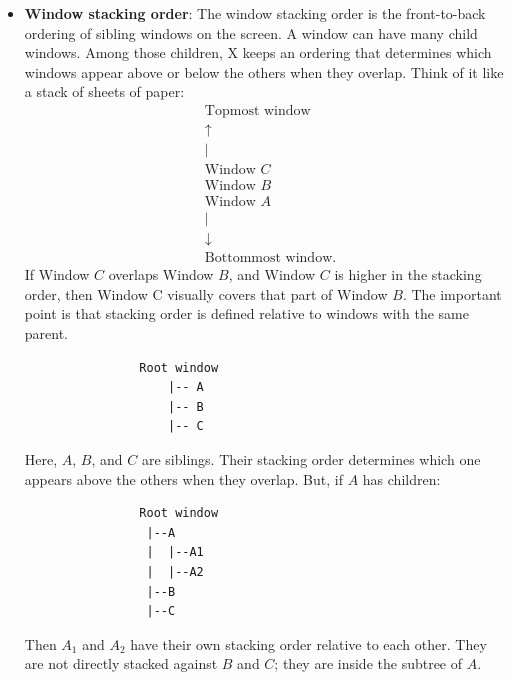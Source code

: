 \documentclass{report}
\begin{document}
\begin{itemize}
            \bigbreak \noindent 
            \textbf{XDestroySubwindows} can generate a \textbf{BadWindow} error.
        \item \textbf{Window stacking order}: The window stacking order is the front-to-back ordering of sibling windows on the screen.
            \bigbreak \noindent 
            A window can have many child windows. Among those children, X keeps an ordering that determines which windows appear above or below the others when they overlap.
            \bigbreak \noindent 
            Think of it like a stack of sheets of paper:
            \begin{align*}
                &\text{Topmost window} \\
                &\uparrow \\
                &\mid \\
                &\text{Window $C$} \\
                &\text{Window $B$} \\
                &\text{Window $A$} \\
                &\mid \\
                &\downarrow \\
                &\text{Bottommost window}
            .\end{align*}
            If Window $C$ overlaps Window $B$, and Window $C$ is higher in the stacking order, then Window C visually covers that part of Window $B$.
            \bigbreak \noindent 
            The important point is that stacking order is defined relative to windows with the same parent.
            \bigbreak \noindent 
            \begin{verbatim}
                Root window
                    |-- A
                    |-- B
                    |-- C
            \end{verbatim}
            \bigbreak \noindent 
            Here, $A$, $B$, and $C$ are siblings. Their stacking order determines which one appears above the others when they overlap.
            \bigbreak \noindent 
            But, if $A$ has children:
            \begin{verbatim}
                Root window
                 |--A
                 |  |--A1
                 |  |--A2
                 |--B
                 |--C
            \end{verbatim}
            \bigbreak \noindent 
            Then $A_{1}$ and $A_{2}$ have their own stacking order relative to each other. They are not directly stacked against $B$ and $C$; they are inside the subtree of $A$.

\end{itemize}
\end{document}
